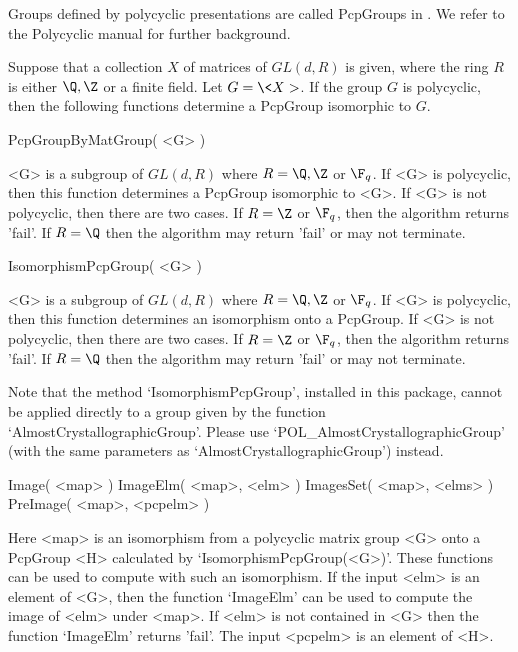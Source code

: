 
 
Groups defined by polycyclic presentations are called PcpGroups in
{\GAP}.
We refer to the Polycyclic manual \cite{polycyclic} for further
background.

Suppose that a collection $X$ of
matrices of $GL(d,R)$ is given, where the ring $R$ 
is either $\Q,\Z$ or a finite field.  Let $G= \< X >$. 
If the group $G$ is polycyclic, then the
following functions determine a PcpGroup isomorphic to $G$.
 
\> PcpGroupByMatGroup( <G> )

<G> is  a subgroup of $GL(d,R)$ where $R=\Q,\Z $ or $\F_q$.
If <G> is polycyclic, then 
this function determines a PcpGroup isomorphic to <G>. 
If <G> is not polycyclic, then there are two cases. If $R=\Z$ or $\F_q$,
then the algorithm returns 'fail'. If $R=\Q$ then the algorithm may
return 'fail' or may not terminate. 

\> IsomorphismPcpGroup( <G> )
 
<G> is  a subgroup of $GL(d,R)$ where $R=\Q,\Z $ or $\F_q$.
If <G> is polycyclic, then 
this function determines  an isomorphism
onto a PcpGroup. 
If <G> is not polycyclic, then there are two cases. If $R=\Z$ or $\F_q$,
then the algorithm returns 'fail'. If $R=\Q$ then the algorithm may
return 'fail' or may not terminate. 

Note that the method `IsomorphismPcpGroup', 
installed in this package, cannot be
applied directly to a group given by the function `AlmostCrystallographicGroup'.
Please use  `POL_AlmostCrystallographicGroup' (with the same
parameters as `AlmostCrystallographicGroup') instead. 

\> Image( <map> ) 
\> ImageElm( <map>, <elm> )
\> ImagesSet( <map>, <elms> )
\> PreImage( <map>, <pcpelm> )
 
Here <map> is an isomorphism from a polycyclic matrix group <G>
onto a PcpGroup <H> calculated
by `IsomorphismPcpGroup(<G>)'.
These functions can be used to compute with such an isomorphism. 
If the input <elm>  is an element of <G>, then the function `ImageElm'
 can be used to compute the image of <elm> under <map>. 
If <elm> is not contained in <G>
then the function `ImageElm' returns 'fail'. 
The input <pcpelm> is an element
of <H>. 

